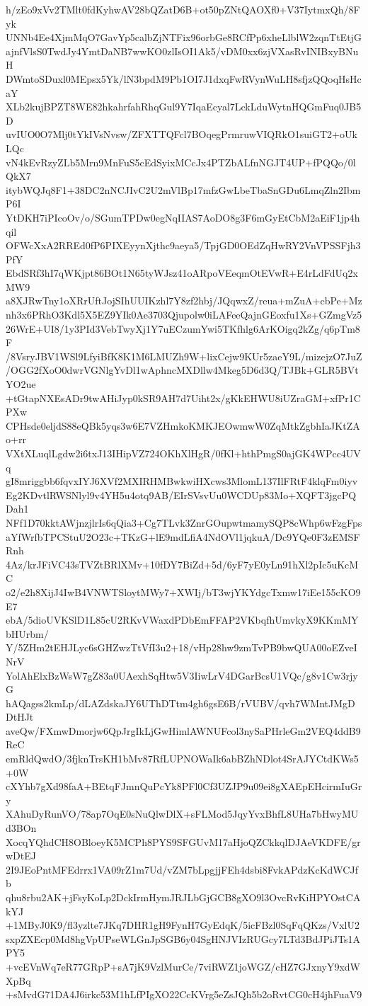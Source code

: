 h/zEo9xVv2TMlt0fdKyhwAV28bQZatD6B+ot50pZNtQAOXf0+V37IytmxQh/8Fyk
UNNb4Ee4XjmMqO7GavYp5calbZjNTFix96orbGe8RCfPp6xheLlblW2zqnTtEtjG
ajnfVlsS0TwdJy4YmtDaNB7wwKO0zlIsOI1Ak5/vDM0xx6zjVXasRvINIBxyBNuH
DWmtoSDuxl0MEpsx5Yk/lN3bpdM9Pb1OI7J1dxqFwRVynWuLH8sfjzQQoqHsHcaY
XLb2kujBPZT8WE82hkahrfahRhqGul9Y7IqaEcyal7LckLduWytnHQGmFuq0JB5D
uvIUO0O7Mlj0tYkIVsNvsw/ZFXTTQFcl7BOqegPrmruwVIQRkO1suiGT2+oUkLQc
vN4kEvRzyZLb5Mrn9MnFuS5cEdSyixMCcJx4PTZbALfnNGJT4UP+fPQQo/0lQkX7
itybWQJq8F1+38DC2nNCJIvC2U2mVlBp17mfzGwLbeTbaSnGDu6LmqZln2IbmP6I
YtDKH7iPIcoOv/o/SGumTPDw0egNqIIAS7AoDO8g3F6mGyEtCbM2aEiF1jp4hqil
OFWcXxA2RREd0fP6PIXEyynXjthc9aeya5/TpjGD0OEdZqHwRY2VnVPSSFjh3PfY
EbdSRf3hI7qWKjpt86BOt1N65tyWJsz41oARpoVEeqmOtEVwR+E4rLdFdUq2xMW9
a8XJRwTny1oXRrUftJojSIhUUIKzhl7Y8zf2hbj/JQqwxZ/reua+mZuA+cbPe+Mz
nh3x6PRhO3Kdl5X5EZ9YIk0Ae3703Qjupolw0iLAFeeQajnGEoxfu1Xs+GZmgVz5
26WrE+UI8/1y3PId3VebTwyXj1Y7uECzumYwi5TKfhlg6ArKOigq2kZg/q6pTm8F
/8VsryJBV1WSl9LfyiBfK8K1M6LMUZh9W+lixCejw9KUr5zaeY9L/mizejzO7JuZ
/OGG2fXoO0dwrVGNlgYvDl1wAphncMXDllw4Mkeg5D6d3Q/TJBk+GLR5BVtYO2ue
+tGtapNXEsADr9twAHiJyp0kSR9AH7d7Uiht2x/gKkEHWU8iUZraGM+xfPr1CPXw
CPHsde0eljdS88eQBk5yqs3w6E7VZHmkoKMKJEOwmwW0ZqMtkZgbhIaJKtZAo+rr
VXtXLuqlLgdw2i6txJ13IHipVZ724OKhXlHgR/0fKl+hthPmgS0ajGK4WPcc4UVq
gI8mriggbb6fqvxIYJ6XVf2MXIRHMBwkwiHXcws3MlomL137IlFRtF4klqFm0iyv
Eg2KDvtlRWSNlyl9v4YH5u4otq9AB/EIrSVsvUu0WCDUp83Mo+XQFT3jgcPQDah1
NFf1D70kktAWjnzjlrIs6qQia3+Cg7TLvk3ZnrGOupwtmamySQP8cWhp6wFzgFps
aYfWrfbTPCStuU2O23c+TKzG+lE9mdLfiA4NdOVl1jqkuA/Dc9YQe0F3zEMSFRnh
4Az/krJFiVC43sTVZtBRlXMv+10fDY7BiZd+5d/6yF7yE0yLn91hXl2pIc5uKcMC
o2/e2h8XijJ4IwB4VNWTSloytMWy7+XWIj/bT3wjYKYdgcTxmw17iEe155cKO9E7
ebA/5dioUVKSlD1L85cU2RKvVWaxdPDbEmFFAP2VKbqfhUmvkyX9KKmMYbHUrbm/
Y/5ZHm2tEHJLyc6sGHZwzTtVfI3u2+18/vHp28hw9zmTvPB9bwQUA00oEZveINrV
YolAhElxBzWsW7gZ83a0UAexhSqHtw5V3IiwLrV4DGarBcsU1VQc/g8v1Cw3rjyG
hAQagss2kmLp/dLAZdskaJY6UThDTtm4gh6gsE6B/rVUBV/qvh7WMntJMgDDtHJt
aveQw/FXmwDmorjw6QpJrgIkLjGwHimlAWNUFcol3nySaPHrleGm2VEQ4ddB9ReC
emRldQwdO/3fjknTrsKH1bMv87RfLUPNOWaIk6abBZhNDlot4SrAJYCtdKWs5+0W
cXYhb7gXd98faA+BEtqFJmnQuPcYk8PFl0Cf3UZJP9u09ei8gXAEpEHcirmIuGry
XAhuDyRunVO/78ap7OqE0sNuQlwDlX+sFLMod5JqyYvxBhfL8UHa7bHwyMUd3BOn
XocqYQhdCH8OBloeyK5MCPh8PYS9SFGUvM17aHjoQZCkkqlDJAeVKDFE/grwDtEJ
2I9JEoPntMFEdrrx1VA09rZ1m7Ud/vZM7bLpgjjFEh4dsbi8FvkAPdzKcKdWCJfb
qhu8rbu2AK+jFsyKoLp2DckIrmHymJRJLbGjGCB8gXO9l3OvcRvKiHPYOstCAkYJ
+1MByJ0K9/fl3yzlte7JKq7DHR1gH9FynH7GyEdqK/5icFBzl0SqFqQKzs/VxlU2
sxpZXEcp0Md8hgVpUPseWLGnJpSGB6y04SgHNJVIzRUGcy7LTd3BdJPiJTs1APY5
+vcEVnWq7eR77GRpP+sA7jK9VzlMurCe/7viRWZ1joWGZ/cHZ7GJxnyY9xdWXpBq
+sMvdG71DA4J6irkc53M1hLfPIgXO22CcKVrg5eZsJQh5b2oRvtCG0cH4jhFuaV9
